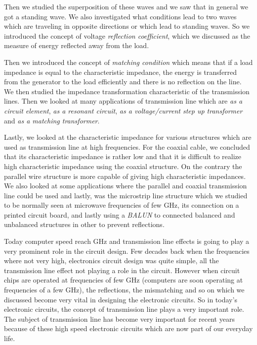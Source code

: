 Then we studied the superposition of these waves and we saw that in general we got a standing wave. We also investigated what conditions lead to two waves which are traveling in opposite directions or which lead to standing waves. So we introduced the concept of voltage \emph{reflection coefficient}, which we discussed as the measure of energy reflected away from the load.

Then we introduced the concept of \emph{matching condition} which means that if a load impedance is equal to the characteristic impedance, the energy is transferred from the generator to the load efficiently and there is no reflection on the line. We then studied the impedance transformation characteristic of the transmission lines. Then we looked at many applications of transmission line which are \emph{as a circuit element}, \emph{as a resonant circuit}, \emph{as a voltage/current step up transformer} and \emph{as a matching transformer}.

Lastly, we looked at the characteristic impedance for various structures which are used as transmission line at high frequencies. For the coaxial cable, we concluded that its characteristic impedance is rather low and that it is difficult to realize high characteristic impedance using the coaxial structure. On the contrary the parallel wire structure is more capable of giving high characteristic impedances. We also looked at some applications where the parallel and coaxial transmission line could be used and lastly, was the microstrip line structure which we studied to be normally seen at microwave frequencies of few GHz, its connection on a printed circuit board, and lastly using a \emph{BALUN} to connected balanced and unbalanced structures in other to prevent reflections.

Today computer speed reach GHz and transmission line effects is going to play a very prominent role in the circuit design. Few decades back when the frequencies where not very high, electronics circuit design was quite simple, all the transmission line effect not playing a role in the circuit. However when circuit chips are operated at frequencies of few GHz (computers are soon operating at frequencies of a few GHz), the reflections, the mismatching and so on which we discussed become very vital in designing the electronic circuits. So in today's electronic circuits, the concept of transmission line plays a very important role. The subject of transmission line has become very important for recent years because of these high speed electronic circuits which are now part of our everyday life.


